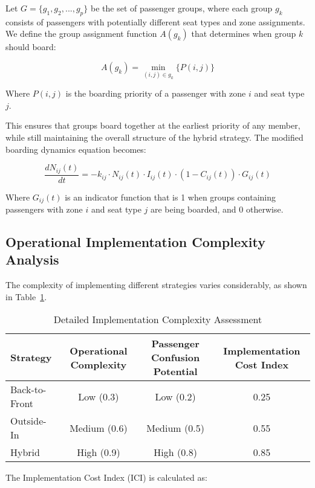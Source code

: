 \documentclass[12pt]{article}
\begin{document}
Let $G = \{g_1, g_2, ..., g_p\}$ be the set of passenger groups, where each group $g_k$ consists of passengers with potentially different seat types and zone assignments. We define the group assignment function $A(g_k)$ that determines when group $k$ should board:

\begin{equation}
A(g_k) = \min_{(i,j) \in g_k} \{P(i,j)\}
\end{equation}

Where $P(i,j)$ is the boarding priority of a passenger with zone $i$ and seat type $j$.

This ensures that groups board together at the earliest priority of any member, while still maintaining the overall structure of the hybrid strategy. The modified boarding dynamics equation becomes:

\begin{equation}
\frac{dN_{ij}(t)}{dt} = -k_{ij} \cdot N_{ij}(t) \cdot I_{ij}(t) \cdot (1 - C_{ij}(t)) \cdot G_{ij}(t)
\end{equation}

Where $G_{ij}(t)$ is an indicator function that is 1 when groups containing passengers with zone $i$ and seat type $j$ are being boarded, and 0 otherwise.

\subsection{Operational Implementation Complexity Analysis}

The complexity of implementing different strategies varies considerably, as shown in Table~\ref{tab:implementation_complexity}.

\begin{table}[h]
\centering
\caption{Detailed Implementation Complexity Assessment}
\begin{tabular}{lccc}
\toprule
\textbf{Strategy} & \textbf{Operational Complexity} & \textbf{Passenger Confusion Potential} & \textbf{Implementation Cost Index} \\
\midrule
Back-to-Front & Low (0.3) & Low (0.2) & 0.25 \\
Outside-In & Medium (0.6) & Medium (0.5) & 0.55 \\
Hybrid & High (0.9) & High (0.8) & 0.85 \\
\bottomrule
\end{tabular}
\label{tab:implementation_complexity}
\end{table}

The Implementation Cost Index (ICI) is calculated as:
\end{document}
